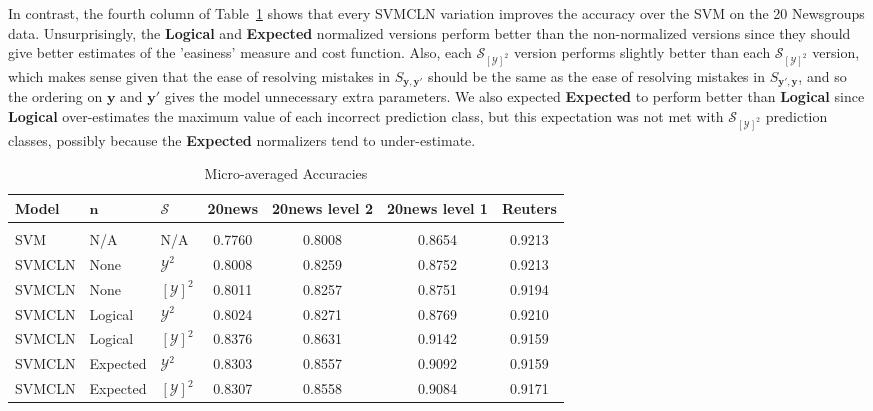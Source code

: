 \documentclass{article} %
\begin{document}
In contrast, the fourth column of Table~\ref{accuraciesTable} shows that 
every SVMCLN variation improves the accuracy over the SVM on the 20 Newsgroups 
data.  Unsurprisingly, the \textbf{Logical} 
and \textbf{Expected} normalized versions
perform better than the non-normalized versions since they should give better
estimates of the 'easiness' measure and cost function.  Also, each 
$\mathcal{S}_{[\mathcal{Y}]^2}$ version performs slightly better than 
each $\mathcal{S}_{[\mathcal{Y}]^2}$ version, which makes sense given that
the ease of resolving mistakes in $S_{\mathbf{y},\mathbf{y}'}$ should be 
the same as the ease of resolving mistakes in $S_{\mathbf{y}',\mathbf{y}}$,
and so the ordering on $\mathbf{y}$ and $\mathbf{y}'$ gives the model
unnecessary extra parameters.  We also expected 
\textbf{Expected} to perform better 
than \textbf{Logical} since \textbf{Logical} 
over-estimates the maximum value of each incorrect prediction class, but
this expectation was not met with 
$\mathcal{S}_{[\mathcal{Y}]^2}$ prediction
classes, possibly because the \textbf{Expected} normalizers tend 
to under-estimate.

\begin{table}[t]
\caption{Micro-averaged Accuracies}
\label{accuraciesTable}
\begin{center}
\begin{tabular}{lllcccc}
\bf{Model}  & \bf{$\mathbf{n}$} & \bf{$\mathcal{S}$} & \bf{20news} & \bf{20news level 2}   & \bf{20news level 1}   & \bf{Reuters}
\\ \hline \\
SVM         & N/A               & N/A                & 0.7760      & 0.8008                & 0.8654                & 0.9213 \\
SVMCLN      & None              & $\mathcal{Y}^2$    & 0.8008      & 0.8259                & 0.8752                & 0.9213 \\ 
SVMCLN      & None              & $[\mathcal{Y}]^2$  & 0.8011      & 0.8257                & 0.8751                & 0.9194 \\
SVMCLN      & Logical           & $\mathcal{Y}^2$    & 0.8024      & 0.8271                & 0.8769                & 0.9210 \\ 
SVMCLN      & Logical           & $[\mathcal{Y}]^2$  & 0.8376      & 0.8631                & 0.9142                & 0.9159 \\
SVMCLN      & Expected          & $\mathcal{Y}^2$    & 0.8303      & 0.8557                & 0.9092                & 0.9159 \\ 
SVMCLN      & Expected          & $[\mathcal{Y}]^2$  & 0.8307      & 0.8558                & 0.9084                & 0.9171 \\
\end{tabular}
\end{center}
\end{table}
\end{document}
